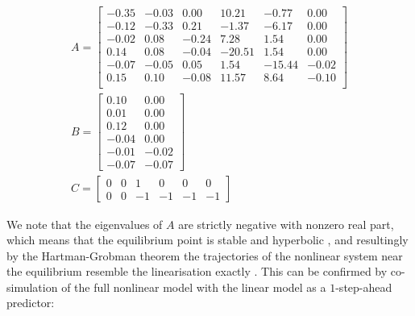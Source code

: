 \begin{equation}\label{eq:LinearisedModelWithTank}
\begin{gathered}
	A = \begin{bmatrix}
		-0.35 & -0.03 & 0.00 & 10.21 & -0.77 & 0.00\\
		-0.12 & -0.33 & 0.21 & -1.37 & -6.17  & 0.00\\
		-0.02 & 0.08 & -0.24 & 7.28 & 1.54 & 0.00\\
		0.14 & 0.08 & -0.04 & -20.51 & 1.54 & 0.00\\
		-0.07 & -0.05 & 0.05 & 1.54 & -15.44 &   -0.02\\
		0.15 & 0.10 & -0.08 & 11.57 & 8.64 & -0.10\\
	\end{bmatrix} \\
	B = \begin{bmatrix}
		0.10 & 0.00\\
		0.01 & 0.00 \\
		0.12 & 0.00 \\
		-0.04 & 0.00 \\
		-0.01 & -0.02\\
		-0.07 & -0.07
	\end{bmatrix}
\\
		C = \begin{bmatrix} 
			0 & 0 & 1 & 0 & 0 & 0	\\		
			0 & 0 & -1 & -1 & -1 & -1
		\end{bmatrix}
\end{gathered}
\end{equation}

We note that the eigenvalues of $A$ are strictly negative with nonzero real part, which means that the equilibrium point is stable and hyperbolic \cite{Khalil}, and resultingly by the Hartman-Grobman theorem the trajectories of the nonlinear system near the equilibrium resemble the linearisation exactly \cite{Perko2001}. This can be confirmed by co-simulation of the full nonlinear model with the linear model as a $1$-step-ahead predictor:


